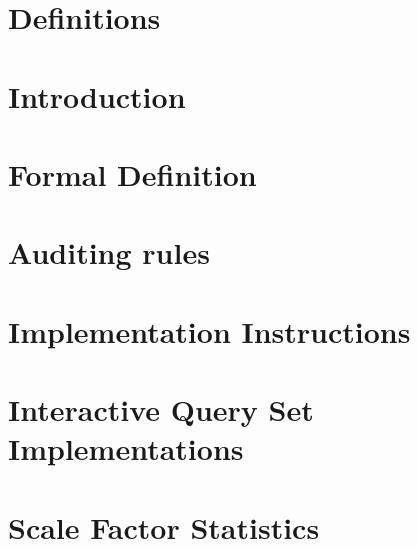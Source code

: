 \documentclass{ldbc}
\author{[Arnau Prat (UPC)]}
\begin{document}
\maketitle

%

\listoffigures
\listoftables
\chapter*{Definitions}


\chapter{Introduction}


\chapter{Formal Definition}


\chapter{Auditing rules}\label{chapter:auditing}


\chapter{Implementation Instructions}\label{chapter:instructions}





\appendix

\chapter{Interactive Query Set Implementations}


\chapter{Scale Factor Statistics}

\end{document}

